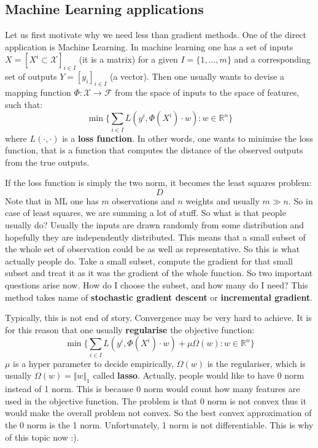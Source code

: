 \subsection{Machine Learning applications}
\par Let us first motivate why we need less than gradient methods. One of the direct application is Machine Learning. In machine learning one has a set of inputs $X = [X^i \subset \mathcal{X}]_{i \in I}$ (it is a matrix) for a given $I = \{1,...,m\}$ and a corresponding set of outputs $Y = [y_i]_{i \in I}$ (a vector). Then one usually wants to devise a mapping function $\Phi : \mathcal{X} \rightarrow \mathcal{F}$ from the space of inputs to the space of features, such that:
\begin{equation}
    \min \{\sum_{i \in I} L(y^i, \Phi(X^i) \cdot w) : w \in \mathbb{R}^n\}
\end{equation}
where $L(\cdot,\cdot)$ is a \textbf{loss function}. In other words, one wants to minimise the loss function, that is a function that computes the distance of the observed outputs from the true outputs.
\par If the loss function is simply the two norm, it becomes the least squares problem:
\begin{equation}
    D
\end{equation}
Note that in ML one has $m$ observations and $n$ weights and usually $m \gg n$. So in case of least squares, we are summing a lot of stuff. So what is that people usually do? Usually the inputs are drawn randomly from some distribution and hopefully they are independently distributed. This means that a small subset of the whole set of observation could be as well as representative. So this is what actually people do. Take a small subset, compute the gradient for that small subset and treat it as it was the gradient of the whole function. So two important questions arise now. How do I choose the subset, and how many do I need? This method takes name of \textbf{stochastic gradient descent} or \textbf{incremental gradient}.
\par Typically, this is not end of story. Convergence may be very hard to achieve. It is for this reason that one usually \textbf{regularise} the objective function:
\begin{equation}
    \min \{\sum_{i \in I} L(y^i, \Phi(X^i) \cdot w) + \mu \Omega(w) : w \in \mathbb{R}^n\}
\end{equation}
$\mu$ is a hyper parameter to decide empirically, $\Omega(w)$ is the regulariser, which is usually $\Omega(w) = \Vert w \Vert_1$ called \textbf{lasso}. Actually, people would like to have 0 norm instead of 1 norm. This is because 0 norm would count how many features are used in the objective function. The problem is that 0 norm is not convex thus it would make the overall problem not convex. So the best convex approximation of the 0 norm is the 1 norm. Unfortunately, 1 norm is not differentiable. This is why of this topic now :).
%
